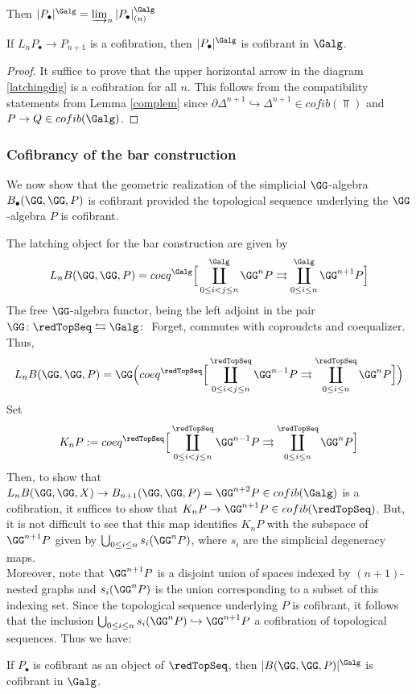 \documentclass[a4paper,10pt]{amsart}
\begin{document}
Then $|P_\bullet|^{\Galg} = \varinjlim_n |P_\bullet|^{\Galg}_{(n)}$

\begin{lemma}
	If $L_nP_\bullet \to P_{n+1}$ is a cofibration, then $|P_\bullet|^{\Galg}$ is cofibrant in $\Galg$.
\end{lemma}
\begin{proof}
	It suffice to prove that the upper horizontal arrow in the diagram \ref{latchingdig} is a cofibration for all $n$. This follows from the compatibility statements from Lemma	 \ref{complem} since $\partial \Delta^{n+1} \hookrightarrow \Delta^{n+1} \in cofib(\Top)$ and $P \to Q \in cofib(\Galg)$.
\end{proof}


\subsubsection{Cofibrancy of the bar construction}\label{Cofibrancy of the bar construction}
We now show that the geometric realization of the simplicial $\GG$-algebra $B_\bullet(\GG,\GG,P)$ is cofibrant provided the topological sequence underlying the $\GG$-algebra $P$ is cofibrant.

The latching object for the bar construction are given by 
\[ L_n B(\GG,\GG,P) = coeq^{\Galg} \Big[ \coprod_{0 \leq i < j \leq n}^{\Galg}\GG^{n}P \rightrightarrows \coprod_{0 \leq i \leq n}^{\Galg} \GG^{n+1}P \Big] \]
The free $\GG$-algebra functor, being the left adjoint in the pair $\GG \colon \redTopSeq \leftrightarrows \Galg \colon$ Forget, commutes with coproudcts and coequalizer. Thus,
\[ L_nB(\GG,\GG,P) = \GG \Big( coeq^{\redTopSeq} \Big[ \coprod_{0 \leq i < j \leq n}^{\redTopSeq}\GG^{n-1}P \rightrightarrows \coprod_{0 \leq i \leq n}^{\redTopSeq} \GG^{n}P \Big] \Big) \]
Set 
\[ K_nP := coeq^{\redTopSeq} \Big[ \coprod_{0 \leq i < j \leq n}^{\redTopSeq}\GG^{n-1}P \rightrightarrows \coprod_{0 \leq i \leq n}^{\redTopSeq} \GG^{n}P \Big] \]
Then, to show that $L_nB(\GG,\GG,X) \to B_{n+1}(\GG,\GG,P) = \GG^{n+2}P \in cofib(\Galg)$ is a cofibration, it suffices to show that $K_nP \to \GG^{n+1}P \in cofib(\redTopSeq)$. But, it is not difficult to see that this map identifies $K_nP$ with the subspace of $\GG^{n+1}P$ given by $\bigcup_{0 \leq i \leq n} s_i(\GG^n P)$, where $s_i$ are the simplicial degeneracy maps.\\
Moreover, note that $\GG^{n+1}P$ is a disjoint union of spaces indexed by $(n+1)$-nested graphs and $s_i(\GG^nP)$ is the union corresponding to a subset of this indexing set. Since the topological sequence underlying $P$ is cofibrant, it follows that the inclusion $\bigcup_{0 \leq i \leq n}s_i(\GG^n P) \hookrightarrow \GG^{n+1}P$ a cofibration of topological sequences. Thus we have:
\begin{proposition}
If $P_\bullet$ is cofibrant as an object of $\redTopSeq$, then $|B(\GG,\GG,P)|^{\Galg}$ is cofibrant in $\Galg$.
\end{proposition}
\end{document}
